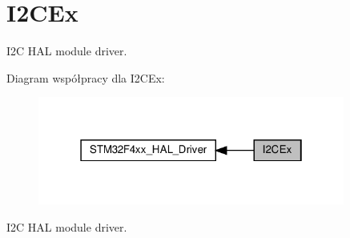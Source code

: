 \hypertarget{group___i2_c_ex}{}\section{I2\+C\+Ex}
\label{group___i2_c_ex}


I2C H\+AL module driver.  


Diagram współpracy dla I2\+C\+Ex\+:\nopagebreak
\begin{figure}[H]
\begin{center}
\leavevmode
\includegraphics[width=286pt]{group___i2_c_ex}
\end{center}
\end{figure}
I2C H\+AL module driver. 

